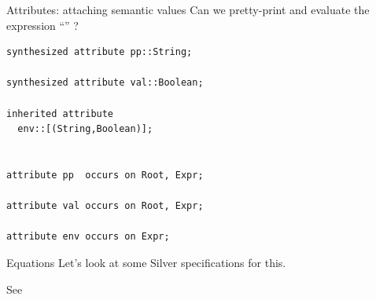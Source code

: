 \documentclass[11pt,aspectratio=169]{beamer}
\newcommand{\ys}{1.3}
\newcommand{\enve}[2]{\draw[blue] ($(#1-0.4,\ys*#2-0.35)$) circle(0.15);}
\newcommand{\envd}[2]{\filldraw[blue] ($(#1-0.4,\ys*#2-0.35)$) circle(0.05);}
\newcommand{\envc}[2]{\filldraw[blue] ($(#1-0.4,\ys*#2-0.35)$) circle(0.15);}
\newcommand{\ppe}[2]{\draw[dgreen] ($(#1+0.4,\ys*#2-0.35)$) circle(0.15);}
\newcommand{\ppd}[2]{\filldraw[dgreen] ($(#1+0.4,\ys*#2-0.35)$) circle(0.05);}
\newcommand{\ppc}[2]{\filldraw[dgreen] ($(#1+0.4,\ys*#2-0.35)$) circle(0.15);}
\newcommand{\vale}[2]{\draw[red] ($(#1+0.8,\ys*#2-0.35)$) circle(0.15);}
\newcommand{\vald}[2]{\filldraw[red] ($(#1+0.8,\ys*#2-0.35)$) circle(0.05);}
\newcommand{\valc}[2]{\filldraw[red] ($(#1+0.8,\ys*#2-0.35)$) circle(0.15);}
\newcommand{\erre}[2]{\draw[orange] ($(#1+1.2,\ys*#2-0.35)$) circle(0.15);}
\newcommand{\rtn}[3]{
\draw ($(#1,#2*\ys)$) node{#3};
\ppe{#1}{#2}
\vale{#1}{#2}

\draw[gray] ($(#1+0.65,\ys*#2+0.25)$) --
            ($(#1-0.3,\ys*#2+0.25)$) arc (90:270:4.5mm);

\draw[gray] ($(#1+0.65,\ys*#2+0.25)$) arc (90:-90:4.5mm) -- 
            ($(#1-0.3,\ys*#2-0.65)$) ;
}
\newcommand{\tn}[3]{
\rtn{#1}{#2}{#3}
\enve{#1}{#2}
}
\newcommand{\tnstr}[3]{
\draw ($(#1,#2*\ys)$) node{#3};
\draw[gray] ($(#1+0.25,\ys*#2+0.25)$) --
            ($(#1-0.2,\ys*#2+0.25)$) arc (90:270:2.5mm);

\draw[gray] ($(#1+0.25,\ys*#2+0.25)$) arc (90:-90:2.5mm) -- 
            ($(#1-0.2,\ys*#2-0.25)$) ;

}
\newcommand{\tedge}[4]{
\draw[gray] ($(#1+\xsh,\ys*#2-0.65)$) -- ($(#3+\xsh,\ys*#4+0.25)$);
}
\newcommand{\ppeval}{
\pause
\ppd{4}{4} %
\pause
\ppd{4}{3} %

\pause
\ppd{4}{2} %
\pause
\ppc{4}{2} %
\pause
\ppd{6.5}{2}  %

\pause
\ppd{5.25}{1} %
\pause
\ppc{5.25}{1} %
\pause
\ppd{7.75}{1} %
\pause
\ppc{7.75}{1} %

\pause
\ppc{6.5}{2}  %

\pause
\ppc{4}{3} %

\pause
\ppc{4}{4} %
}
\newcommand{\valeval}{
\pause\vald{4}{4} %
\pause\vald{4}{3} %

\pause\vald{6.5}{2}  %
\pause\vald{5.25}{1} %
\pause\valc{5.25}{1} %

\pause\vald{7.75}{1} %

\pause\envd{7.75}{1} %

\pause\envd{6.5}{2}  %

\pause
\draw ($(5.5,\ys*-0.5)$) node {\small\texttt{body.env = (name, dexp.val) :: e.env;}};

\pause\vald{4}{2} %
\pause\valc{4}{2} %

\pause\envd{4}{3} %
\pause\envc{4}{3} %

\pause\envc{6.5}{2}  %

\pause

\pause\envc{7.75}{1} %

\pause\valc{7.75}{1} %
\pause\valc{6.5}{2}  %

\pause\valc{4}{3} %

\pause\valc{4}{4} %
}
\newcommand{\xsh}{0.15}
\begin{document}
\begin{frame}[t,fragile]{Attributes: attaching semantic values}
Can we pretty-print and evaluate the expression
``'' ?

\bigskip

\begin{minipage}[t]{2.9in}
\vspace{0pt}
\end{minipage}
\begin{minipage}[t]{2.1in}
\vspace{0pt}
\small
\begin{verbatim}
synthesized attribute pp::String;

synthesized attribute val::Boolean;

inherited attribute 
  env::[(String,Boolean)];


attribute pp  occurs on Root, Expr;

attribute val occurs on Root, Expr;

attribute env occurs on Expr;
\end{verbatim}
\end{minipage}

\end{frame}

\begin{frame}{Equations}
Let's look at some Silver specifications for this.

\bigskip
See 
\end{frame}
\end{document}
